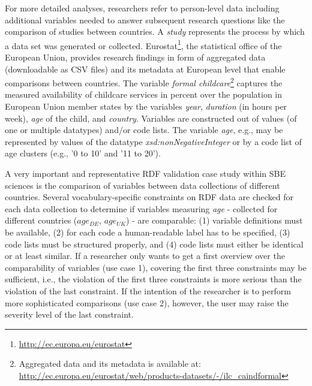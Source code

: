 \documentclass{llncs}
\begin{document}
For more detailed analyses, researchers refer to person-level data including additional variables needed to answer subsequent research questions
like the comparison of studies between countries.
A \emph{study} represents the process by which a data set was generated or collected.
Eurostat\footnote{\url{http://ec.europa.eu/eurostat}}, the statistical office of the European Union, provides research findings in form of aggregated data (downloadable as CSV files) and its metadata at European level that enable comparisons between countries.
The variable \emph{formal childcare}\footnote{Aggregated data and its metadata is available at: \url{http://ec.europa.eu/eurostat/web/products-datasets/-/ilc_caindformal}} %
captures the measured availability of childcare services in percent over the population in European Union member states by 
the variables \emph{year}, \emph{duration} (in hours per week), \emph{age} of the child, and \emph{country}.
Variables are constructed out of values (of one or multiple datatypes) and/or code lists.
The variable \emph{age}, e.g., may be represented by values of the datatype \emph{xsd:nonNegativeInteger} or by a code list of age clusters (e.g., '0 to 10' and '11 to 20'). 

A very important and representative RDF validation case study within SBE sciences is the comparison of variables between data collections of different countries.
Several vocabulary-specific constraints on RDF data are checked for each data collection
to determine if variables measuring \emph{age} 
- collected for different countries (\emph{$age_{DE}$}, \emph{$age_{UK}$}) - 
are comparable:
(1) variable definitions must be available, 
(2) for each code a human-readable label has to be specified,
(3) code lists must be structured properly, and
(4) code lists must either be identical or at least similar.
If a researcher only wants to get a first overview over the comparability of variables (use case 1), 
covering the first three constraints may be sufficient,
i.e., the violation of the first three constraints is more serious than the violation of the last constraint.
If the intention of the researcher is to perform more sophisticated comparisons (use case 2), however, the user may raise the severity level of the last constraint.
 
\end{document}
